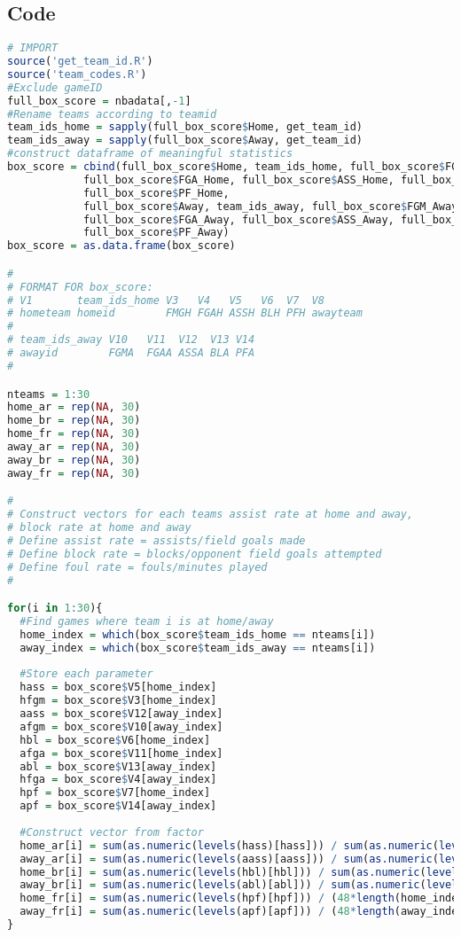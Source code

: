 \documentclass{article}
\begin{document}
\subsection{Code}
\label{rcode}
\begin{lstlisting}[language=R, caption=R Code to Perform Data Analysis]
# IMPORT
source('get_team_id.R')
source('team_codes.R')
#Exclude gameID
full_box_score = nbadata[,-1]
#Rename teams according to teamid
team_ids_home = sapply(full_box_score$Home, get_team_id)
team_ids_away = sapply(full_box_score$Away, get_team_id)
#construct dataframe of meaningful statistics
box_score = cbind(full_box_score$Home, team_ids_home, full_box_score$FGM_Home,
            full_box_score$FGA_Home, full_box_score$ASS_Home, full_box_score$BL_Home,
            full_box_score$PF_Home, 
            full_box_score$Away, team_ids_away, full_box_score$FGM_Away, 
            full_box_score$FGA_Away, full_box_score$ASS_Away, full_box_score$BL_Away,
            full_box_score$PF_Away)
box_score = as.data.frame(box_score)

#
# FORMAT FOR box_score:
# V1       team_ids_home V3   V4   V5   V6  V7  V8       
# hometeam homeid        FMGH FGAH ASSH BLH PFH awayteam 
#
# team_ids_away V10   V11  V12  V13 V14
# awayid        FGMA  FGAA ASSA BLA PFA
#

nteams = 1:30
home_ar = rep(NA, 30)
home_br = rep(NA, 30)
home_fr = rep(NA, 30)
away_ar = rep(NA, 30)
away_br = rep(NA, 30)
away_fr = rep(NA, 30)

#
# Construct vectors for each teams assist rate at home and away,
# block rate at home and away
# Define assist rate = assists/field goals made
# Define block rate = blocks/opponent field goals attempted
# Define foul rate = fouls/minutes played
#

for(i in 1:30){
  #Find games where team i is at home/away
  home_index = which(box_score$team_ids_home == nteams[i])
  away_index = which(box_score$team_ids_away == nteams[i])
  
  #Store each parameter
  hass = box_score$V5[home_index]
  hfgm = box_score$V3[home_index]
  aass = box_score$V12[away_index]
  afgm = box_score$V10[away_index]
  hbl = box_score$V6[home_index]
  afga = box_score$V11[home_index]
  abl = box_score$V13[away_index]
  hfga = box_score$V4[away_index]
  hpf = box_score$V7[home_index]
  apf = box_score$V14[away_index]
  
  #Construct vector from factor
  home_ar[i] = sum(as.numeric(levels(hass)[hass])) / sum(as.numeric(levels(hfgm)[hfgm]))
  away_ar[i] = sum(as.numeric(levels(aass)[aass])) / sum(as.numeric(levels(afgm)[afgm]))
  home_br[i] = sum(as.numeric(levels(hbl)[hbl])) / sum(as.numeric(levels(afga)[afga]))
  away_br[i] = sum(as.numeric(levels(abl)[abl])) / sum(as.numeric(levels(hfga)[hfga]))
  home_fr[i] = sum(as.numeric(levels(hpf)[hpf])) / (48*length(home_index))
  away_fr[i] = sum(as.numeric(levels(apf)[apf])) / (48*length(away_index))
}


\end{lstlisting}
\end{document}
